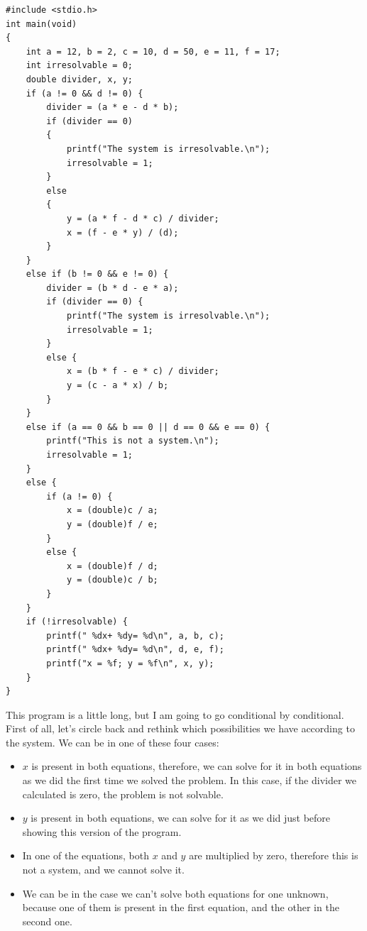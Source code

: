 \documentclass[a4paper]{article}
\begin{document}
\newpage
\begin{lstlisting}[style=C,
caption={Program solving a linear equations system with conditionals},
label={lst:linealSystemFinal}]
#include <stdio.h>
int main(void)
{
    int a = 12, b = 2, c = 10, d = 50, e = 11, f = 17;
    int irresolvable = 0;
    double divider, x, y;
    if (a != 0 && d != 0) {
        divider = (a * e - d * b);
        if (divider == 0)
        {
            printf("The system is irresolvable.\n");
            irresolvable = 1;
        }
        else
        {
            y = (a * f - d * c) / divider;
            x = (f - e * y) / (d);
        }
    }
    else if (b != 0 && e != 0) {
        divider = (b * d - e * a);
        if (divider == 0) {
            printf("The system is irresolvable.\n");
            irresolvable = 1;
        }
        else {
            x = (b * f - e * c) / divider;
            y = (c - a * x) / b;
        }
    }
    else if (a == 0 && b == 0 || d == 0 && e == 0) {
        printf("This is not a system.\n");
        irresolvable = 1;
    }
    else {
        if (a != 0) {
            x = (double)c / a;
            y = (double)f / e;
        }
        else {
            x = (double)f / d;
            y = (double)c / b;
        }
    }
    if (!irresolvable) {
        printf(" %dx+ %dy= %d\n", a, b, c);
        printf(" %dx+ %dy= %d\n", d, e, f);
        printf("x = %f; y = %f\n", x, y);
    }
}
\end{lstlisting}

This program is a little long, but I am going to go conditional by conditional.
First of all, let's circle back and rethink which possibilities we have
according to the system. We can be in one of these four cases:
\begin{itemize}
\item $x$ is present in both equations, therefore, we can solve for it in both
equations as we did the first time we solved the problem. In this case, if
the divider we calculated is zero, the problem is not solvable.
\item $y$ is present in both equations, we can solve for it as we did just
before showing this version of the program.
\item In one of the equations, both $x$ and $y$ are multiplied by zero,
therefore this is not a system, and we cannot solve it.
\item We can be in the case we can't solve both equations for one unknown,
because one of them is present in the first equation, and the other in the
second one.
\end{itemize}
\end{document}
